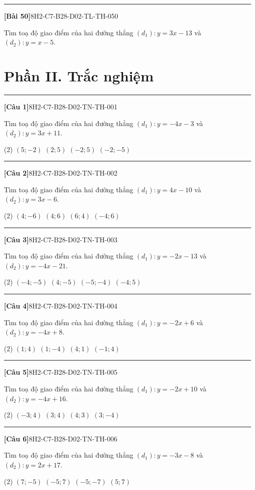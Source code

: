 \documentclass[12pt,a4paper]{article}
\newif\ifloigiai
\newenvironment{cauhoi}[2]{%
  \par\medskip\noindent\rule{\textwidth}{0.4pt}\par\nopagebreak
  \noindent\textbf{[#1]}\hfill{\scriptsize\ttfamily #2}\par\nopagebreak\smallskip}{\par}
\newcommand{\loigiai}[1]{\ifloigiai\par\smallskip\noindent\textit{Lời giải.} #1\par\fi}
\newcommand{\dapan}[1]{\ifloigiai\par\smallskip\noindent\textit{Đáp án:} \textbf{#1}\par\fi}
\begin{document}
\begin{cauhoi}{Bài 50}{8H2-C7-B28-D02-TL-TH-050}
Tìm toạ độ giao điểm của hai đường thẳng $(d_1): y=3x-13$ và $(d_2): y=x-5$.
\loigiai{Hoành độ giao điểm là nghiệm của phương trình $3x-13=x-5$, suy ra $2x=8$ nên $x=4$. Thay vào $(d_1)$: $y=3\cdot(4)-13=-1$. Vậy giao điểm là $(4;-1)$.}
\end{cauhoi}
\clearpage\section*{Phần II. Trắc nghiệm}
\begin{cauhoi}{Câu 1}{8H2-C7-B28-D02-TN-TH-001}
Tìm toạ độ giao điểm của hai đường thẳng $(d_1): y=-4x-3$ và $(d_2): y=3x+11$.
\begin{tasks}(2)
\task $(5;-2)$
\task $(2;5)$
\task $(-2;5)$
\task $(-2;-5)$
\end{tasks}
\dapan{C}
\end{cauhoi}
\begin{cauhoi}{Câu 2}{8H2-C7-B28-D02-TN-TH-002}
Tìm toạ độ giao điểm của hai đường thẳng $(d_1): y=4x-10$ và $(d_2): y=3x-6$.
\begin{tasks}(2)
\task $(4;-6)$
\task $(4;6)$
\task $(6;4)$
\task $(-4;6)$
\end{tasks}
\dapan{B}
\end{cauhoi}
\begin{cauhoi}{Câu 3}{8H2-C7-B28-D02-TN-TH-003}
Tìm toạ độ giao điểm của hai đường thẳng $(d_1): y=-2x-13$ và $(d_2): y=-4x-21$.
\begin{tasks}(2)
\task $(-4;-5)$
\task $(4;-5)$
\task $(-5;-4)$
\task $(-4;5)$
\end{tasks}
\dapan{A}
\end{cauhoi}
\begin{cauhoi}{Câu 4}{8H2-C7-B28-D02-TN-TH-004}
Tìm toạ độ giao điểm của hai đường thẳng $(d_1): y=-2x+6$ và $(d_2): y=-4x+8$.
\begin{tasks}(2)
\task $(1;4)$
\task $(1;-4)$
\task $(4;1)$
\task $(-1;4)$
\end{tasks}
\dapan{A}
\end{cauhoi}
\begin{cauhoi}{Câu 5}{8H2-C7-B28-D02-TN-TH-005}
Tìm toạ độ giao điểm của hai đường thẳng $(d_1): y=-2x+10$ và $(d_2): y=-4x+16$.
\begin{tasks}(2)
\task $(-3;4)$
\task $(3;4)$
\task $(4;3)$
\task $(3;-4)$
\end{tasks}
\dapan{B}
\end{cauhoi}
\begin{cauhoi}{Câu 6}{8H2-C7-B28-D02-TN-TH-006}
Tìm toạ độ giao điểm của hai đường thẳng $(d_1): y=-3x-8$ và $(d_2): y=2x+17$.
\begin{tasks}(2)
\task $(7;-5)$
\task $(-5;7)$
\task $(-5;-7)$
\task $(5;7)$
\end{tasks}
\dapan{B}
\end{cauhoi}
\end{document}
